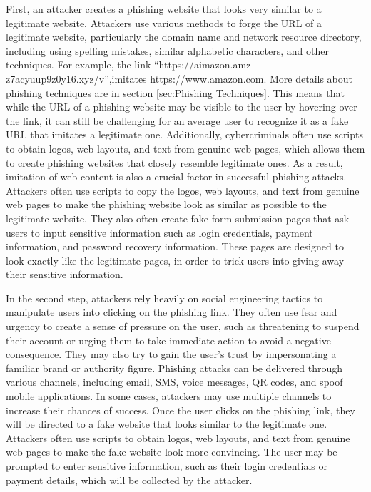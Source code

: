 \documentclass[final]{cvpr}
\begin{document}
First, an attacker creates a phishing website that looks very similar to a legitimate website. Attackers use various methods to forge the URL of a legitimate website, particularly the domain name and network resource directory, including using spelling mistakes, similar alphabetic characters, and other techniques. For example, the link “https://aimazon.amz-z7acyuup9z0y16.xyz/v”,imitates https://www.amazon.com. More details about phishing techniques are in section \ref{sec:Phishing Techniques}. This means that while the URL of a phishing website may be visible to the user by hovering over the link, it can still be challenging for an average user to recognize it as a fake URL that imitates a legitimate one. Additionally, cybercriminals often use scripts to obtain logos, web layouts, and text from genuine web pages, which allows them to create phishing websites that closely resemble legitimate ones. As a result, imitation of web content is also a crucial factor in successful phishing attacks. Attackers often use scripts to copy the logos, web layouts, and text from genuine web pages to make the phishing website look as similar as possible to the legitimate website. They also often create fake form submission pages that ask users to input sensitive information such as login credentials, payment information, and password recovery information. These pages are designed to look exactly like the legitimate pages, in order to trick users into giving away their sensitive information.

In the second step, attackers rely heavily on social engineering tactics to manipulate users into clicking on the phishing link. They often use fear and urgency to create a sense of pressure on the user, such as threatening to suspend their account or urging them to take immediate action to avoid a negative consequence. They may also try to gain the user's trust by impersonating a familiar brand or authority figure. Phishing attacks can be delivered through various channels, including email, SMS, voice messages, QR codes, and spoof mobile applications. In some cases, attackers may use multiple channels to increase their chances of success. Once the user clicks on the phishing link, they will be directed to a fake website that looks similar to the legitimate one. Attackers often use scripts to obtain logos, web layouts, and text from genuine web pages to make the fake website look more convincing. The user may be prompted to enter sensitive information, such as their login credentials or payment details, which will be collected by the attacker.
\end{document}
